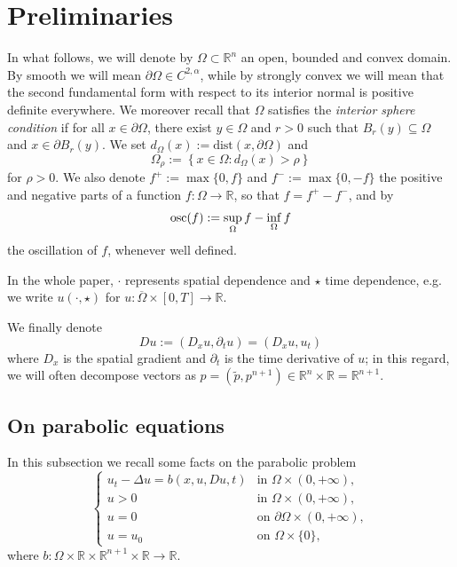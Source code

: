 \documentclass[11pt, reqno]{amsart}
\theoremstyle{definition}
\numberwithin{equation}{section}
\newcommand{\Omegabar}{\overline{\Omega}}
\newcommand{\R}{\mathbb{R}}
\newcommand{\osc}{{\rm osc}}
\begin{document}
 
\section{Preliminaries}
\label{sec_prelimin}

In what follows, we will denote by $\Omega \subset \R^n$ an open, bounded and convex domain. By smooth we will mean $\partial\Omega\in C^{2,\alpha}$, while by strongly convex we will mean that the second fundamental form with respect to its interior normal is positive
definite everywhere. 
We moreover recall that $\Omega$ satisfies the \textit{interior sphere condition} if for all $x\in \partial \Omega$, there exist $y\in \Omega$ and $r>0$ such that $B_r(y)\subseteq \Omega$ and $x\in \partial B_r(y)$.
We %
set 
$ d_\Omega(x):= \text{dist}(x,\partial \Omega)$ and 
$$\Omega_\rho:=\left\{x\in \Omega: d_{\Omega}(x)> \rho\right\}$$
for $\rho>0$.
We also denote $f^+:=\max\{0,f\}$ and $f^-:=\max\{0, -f\}$ the positive and negative parts of a function $f\colon \Omega \to \R$, so that $f=f^+-f^-$, and by 
$$\osc(f):=\sup_{\Omega} f-\inf_{\Omega} f$$
the oscillation of $f$, whenever well defined.

In the whole paper, $\cdot$ represents spatial dependence and $\star$ time dependence, e.g. we write $u(\cdot, \star)$ for $u\colon \Omegabar \times [0,T] \to \R$. 

We finally denote 
$$Du:=(D_x u,\partial_t u) =(D_x u, u_t)$$
where $D_x$ is the spatial gradient and $\partial_t$ is the time derivative of $u$; in this regard, we will often decompose vectors as $p=(\tilde{p}, p^{n+1}) \in \R^n \times \R = \R^{n+1} $.


\subsection{On parabolic equations}

In this subsection we recall some facts on the parabolic problem
	\begin{equation}\label{eqz problema limite, parabolico}
		\begin{cases}
			u_t-\Delta u=b(x,u,Du, t) &\text{in }\Omega\times (0,+\infty),\\
			u>0 & \text{in } \Omega\times (0,+\infty),\\
			u=0 & \text{on }\partial \Omega\times (0,+\infty),\\ 
			u=u_0& \text{on } \Omega \times \{0\}, 
		\end{cases}
	\end{equation}
where $b\colon\Omega\times \R\times \R^{n+1}\times \R\to \R$.
\end{document}
